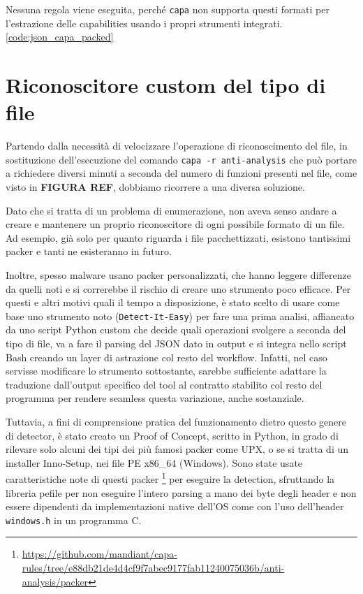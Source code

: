 Nessuna regola viene eseguita, perché \texttt{capa} non supporta questi formati per l'estrazione delle capabilities usando i propri strumenti integrati. \ref{code:json_capa_packed}

\section{Riconoscitore custom del tipo di file}
Partendo dalla necessità di velocizzare l'operazione di riconoscimento del file, in sostituzione dell'esecuzione del comando \texttt{capa -r anti-analysis} che può portare a richiedere diversi minuti a seconda del numero di funzioni presenti nel file, come visto in \textbf{FIGURA REF},
dobbiamo ricorrere a una diversa soluzione.

Dato che si tratta di un problema di enumerazione, non aveva senso andare a creare e mantenere un proprio riconoscitore di ogni possibile formato di un file. Ad esempio, già solo per quanto riguarda i file pacchettizzati, esistono tantissimi packer e tanti ne esisteranno in futuro.

Inoltre, spesso malware usano packer personalizzati, che hanno leggere differenze da quelli noti e si correrebbe il rischio di creare uno strumento poco efficace.
Per questi e altri motivi quali il tempo a disposizione, è stato scelto di usare come base uno strumento noto (\texttt{Detect-It-Easy}) per fare una prima analisi, affiancato da uno script Python custom che decide quali operazioni svolgere a seconda del tipo di file, va a fare il parsing del JSON dato in output e si integra nello script Bash creando un layer di astrazione col resto del workflow.
Infatti, nel caso servisse modificare lo strumento sottostante, sarebbe sufficiente adattare la traduzione dall'output specifico del tool al contratto stabilito col resto del programma per rendere seamless questa variazione, anche sostanziale.

Tuttavia, a fini di comprensione pratica del funzionamento dietro questo genere di detector, è stato creato un Proof of Concept, scritto in Python, in grado di rilevare solo alcuni dei tipi dei più famosi packer come UPX, o se si tratta di un installer Inno-Setup, nei file PE x86\_64 (Windows).
Sono state usate caratteristiche note di questi packer
\footnote{\url{https://github.com/mandiant/capa-rules/tree/e88db21de4d4cf9f7abec9177fab11240075036b/anti-analysis/packer}}
per eseguire la detection, sfruttando la libreria pefile per non eseguire l'intero parsing a mano dei byte degli header e non essere dipendenti da implementazioni native dell'OS come con l'uso dell'header \texttt{windows.h} in un programma C.


